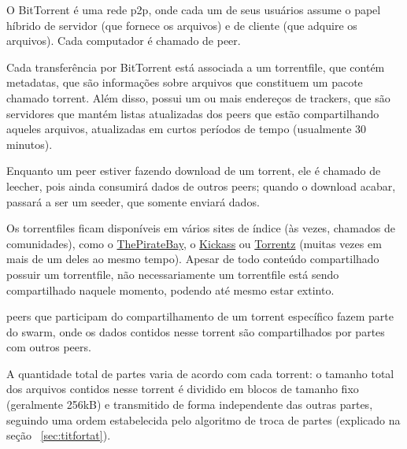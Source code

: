 
O BitTorrent é uma rede \gls{p2p}, onde cada um de seus usuários assume o papel híbrido
de servidor (que fornece os arquivos) e de cliente (que adquire os arquivos). Cada
computador é chamado de \gls{peer}.

Cada transferência por BitTorrent está associada a um \gls{torrentfile}, que contém
\glspl{metadata}, que são informações sobre arquivos que constituem um pacote chamado
\gls{torrent}. Além disso, possui um ou mais endereços de \glspl{tracker}, que são
servidores que mantém listas atualizadas dos \glspl*{peer} que estão compartilhando
aqueles arquivos, atualizadas em curtos períodos de tempo (usualmente 30 minutos).

\begin{comment}
    \begin{figure}[ht!]
        \centering
        \fbox{\texttt{[image: funcionamento.png]}}
        \caption{esquema básico do funcionamento do BitTorrent}
        \label{fig:torrent-basics}
    \end{figure}
\end{comment}

Enquanto um \gls*{peer} estiver fazendo download de um \gls*{torrent}, ele é chamado de
\gls{leecher}, pois ainda consumirá dados de outros \glspl*{peer}; quando o download
acabar, passará a ser um \gls{seeder}, que somente enviará dados.

Os \glspl*{torrentfile} ficam disponíveis em vários sites de índice (às vezes, chamados
de comunidades), como o \href{http://thepiratebay.sx/}{ThePirateBay}, o
\href{http://kickass.to/}{Kickass} ou \href{https://torrentz.eu/}{Torrentz} (muitas
vezes em mais de um deles ao mesmo tempo). Apesar de todo conteúdo compartilhado possuir
um \gls*{torrentfile}, não necessariamente um \gls*{torrentfile} está sendo
compartilhado naquele momento, podendo até mesmo estar extinto.

\Glspl*{peer} que participam do compartilhamento de um \gls*{torrent} específico
fazem parte do \gls{swarm}, onde os dados contidos nesse \gls*{torrent} são
compartilhados por partes com outros \glspl*{peer}.

A quantidade total de partes varia de acordo com cada \gls*{torrent}: o tamanho total
dos arquivos contidos nesse \gls*{torrent} é dividido em blocos de tamanho fixo
(geralmente 256kB) e transmitido de forma independente das outras partes, seguindo uma
ordem estabelecida pelo algoritmo de troca de partes (explicado na seção
~\ref{sec:titfortat}).

